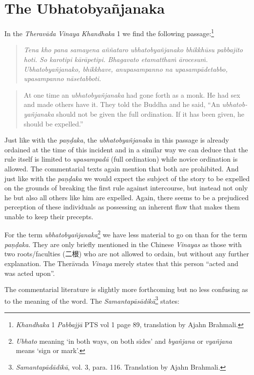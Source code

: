 \section{The Ubhatob­yañ­janaka}
In the {\em Theravāda} {\em Vinaya} {\em Khandhaka} 1 we find the following passage:\footnote{{\em Khandhaka} 1 {\em Pabbajjā} PTS vol 1 page 89, translation by Ajahn Brahmali.}

\begin{quote}
{\em Tena kho pana samayena aññataro ubhatobyañjanako bhikkhūsu pabbajito hoti. So karotipi kārāpetipi. Bhagavato etamatthaṁ ārocesuṁ. Ubhatobyañjanako, bhikkhave, anupasampanno na upasampādetabbo, upasampanno nāsetabboti.}
\end{quote}

\begin{quote}
At one time an {\em ubhatob­yañ­janaka} had gone forth as a monk. He had sex and made others have it. They told the Buddha and he said, “An {\em ubhatob­yañ­janaka} should not be given the full ordination. If it has been given, he should be expelled.”
\end{quote}

Just like with the {\em paṇḍaka}, the {\em ubhatob­yañ­janaka} in this passage is already ordained at the time of this incident and in a similar way we can deduce that the rule itself is limited to {\em upasampadā} (full ordination) while novice ordination is allowed. The commentarial texts again mention that both are prohibited. And just like with the {\em paṇḍaka} we would expect the subject of the story to be expelled on the grounds of breaking the first rule against intercourse, but instead not only he but also all others like him are expelled. Again, there seems to be a prejudiced perception of these individuals as possessing an inherent flaw that makes them unable to keep their precepts.

For the term {\em ubhatob­yañ­janaka}\footnote{{\em Ubhato} meaning `in both ways, on both sides' and {\em byañjana} or {\em vyañjana} means `sign or mark'.} we have less material to go on than for the term {\em paṇḍaka}. They are only briefly mentioned in the Chinese {\em Vinayas} as those with two roots/faculties (二根) who are not allowed to ordain, but without any further explanation. The Therāvada {\em Vinaya} merely states that this person ``acted and was acted upon''. 

The commentarial literature is slightly more forthcoming but no less confusing as to the meaning of the word. The {\em Samantapāsādikā}\footnote{{\em Samantapādādikā}, vol. 3, para. 116. Translation by Ajahn Brahmali.} states:


